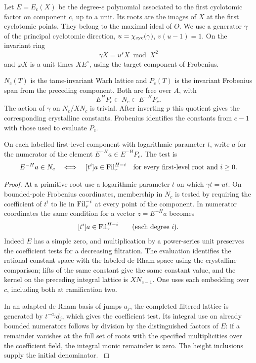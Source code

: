 Let \(E=E_c(X)\)
be the degree-\(e\) polynomial associated to the first cyclotomic
factor on component \(c\), up to a unit. Its roots are the images of
\(X\) at the first cyclotomic points. They belong to the maximal
ideal of \(O\). We use a generator \(\gamma\) of the principal
cyclotomic direction, \(u=\chi_{\rm cyc}(\gamma)\), \(v(u-1)=1\).
On the invariant ring
\[
 \gamma X=u^s X\bmod X^2
\]
and
\(\varphi X\) is a unit times \(X E^s\), using the target component
of Frobenius.

\(N_c(T)\) is the tame-invariant Wach lattice and \(P_c(T)\)
is the invariant Frobenius span from the preceding component. Both
are free over \(A\), with
\[
             E^H P_c\subset N_c\subset E^{-H}P_c .
\]
The action of \(\gamma\) on \(N_c/XN_c\) is trivial. After inverting
\(p\) this quotient gives the corresponding crystalline constants.
Frobenius identifies the constants from \(c-1\) with those used
to evaluate \(P_c\).

\begin{lemma}
On each labelled first-level component with logarithmic parameter
\(t\), write \(a\) for the numerator of the element \(E^{-H}a\in E^{-H}P_c\). The test is
\[
 E^{-H}a\in N_c\quad\Longleftrightarrow\quad [t^i]a\in {\rm Fil}^{H-i}_\tau\quad\text{for every first-level root and }i\ge0.
\]
\end{lemma}
\begin{proof}
At a primitive root use a logarithmic parameter
\(t\) on which \(\gamma t=ut\). On bounded-pole Frobenius coordinates,
membership in \(N_c\) is tested by requiring the coefficient of
\(t^i\) to lie in \({\rm Fil}^{-i}_\tau\) at every point of the
component. In numerator coordinates the same condition for a vector \(z=E^{-H}a\) becomes
\[
 [t^i]a\in{\rm Fil}^{H-i}_\tau\qquad(\text{each degree }i).
\]
Indeed \(E\) has a simple zero, and multiplication by a power-series unit preserves the coefficient tests for a decreasing filtration. The evaluation identifies the rational constant
space with the labeled de Rham space using the crystalline comparison;
lifts of the same constant give the same constant value, and the
kernel on the preceding integral lattice is \(XN_{c-1}\).
One uses each embedding over \(c\), including both at ramification
two.

In an adapted de Rham basis of jumps \(a_j\), the completed
filtered lattice is generated by \(t^{-a_j}d_j\), which gives
the coefficient test. Its integral use on already bounded
numerators follows by division by the distinguished factors of
\(E\): if a remainder vanishes at the full set of roots with the
specified multiplicities over the coefficient field, the integral
monic remainder is zero. The height inclusions supply the initial denominator.
\label{cor:row-metric-1}
\end{proof}

